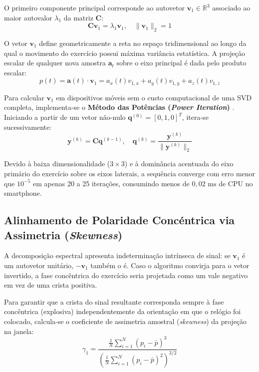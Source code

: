 \documentclass[12pt,openany,oneside,a4paper,english,brazil]{abntex2}
\begin{document}
O primeiro componente principal corresponde ao autovetor $\mathbf{v}_1 \in \mathbb{R}^3$ associado ao maior autovalor $\lambda_1$ da matriz $\mathbf{C}$:
\begin{equation}
    \mathbf{C} \mathbf{v}_1 = \lambda_1 \mathbf{v}_1, \quad \|\mathbf{v}_1\|_2 = 1
\end{equation}

O vetor $\mathbf{v}_1$ define geometricamente a reta no espaço tridimensional ao longo da qual o movimento do exercício possui máxima variância estatística. A projeção escalar de qualquer nova amostra $\mathbf{a}_t$ sobre o eixo principal é dada pelo produto escalar:
\begin{equation}
    p(t) = \mathbf{a}(t) \cdot \mathbf{v}_1 = a_x(t) v_{1,x} + a_y(t) v_{1,y} + a_z(t) v_{1,z}
\end{equation}

Para calcular $\mathbf{v}_1$ em dispositivos móveis sem o custo computacional de uma SVD completa, implementa-se o \textbf{Método das Potências (\textit{Power Iteration})} \cite{golub2013}. Iniciando a partir de um vetor não-nulo $\mathbf{q}^{(0)} = [0, 1, 0]^T$, itera-se sucessivamente:
\begin{equation}
    \mathbf{y}^{(k)} = \mathbf{C} \mathbf{q}^{(k-1)}, \quad \mathbf{q}^{(k)} = \frac{\mathbf{y}^{(k)}}{\|\mathbf{y}^{(k)}\|_2}
\end{equation}

Devido à baixa dimensionalidade ($3 \times 3$) e à dominância acentuada do eixo primário do exercício sobre os eixos laterais, a sequência converge com erro menor que $10^{-5}$ em apenas 20 a 25 iterações, consumindo menos de $0{,}02\text{ ms}$ de CPU no smartphone.

\subsection{Alinhamento de Polaridade Concéntrica via Assimetria (\textit{Skewness})}
A decomposição espectral apresenta indeterminação intrínseca de sinal: se $\mathbf{v}_1$ é um autovetor unitário, $-\mathbf{v}_1$ também o é. Caso o algoritmo convirja para o vetor invertido, a fase concêntrica do exercício seria projetada como um vale negativo em vez de uma crista positiva.

Para garantir que a crista do sinal resultante corresponda sempre à fase concêntrica (explosiva) independentemente da orientação em que o relógio foi colocado, calcula-se o coeficiente de assimetria amostral (\textit{skewness}) da projeção na janela:
\begin{equation}
    \gamma_1 = \frac{\frac{1}{N} \sum_{i=1}^N (p_i - \bar{p})^3}{\left( \frac{1}{N} \sum_{i=1}^N (p_i - \bar{p})^2 \right)^{3/2}}
\end{equation}
\end{document}
